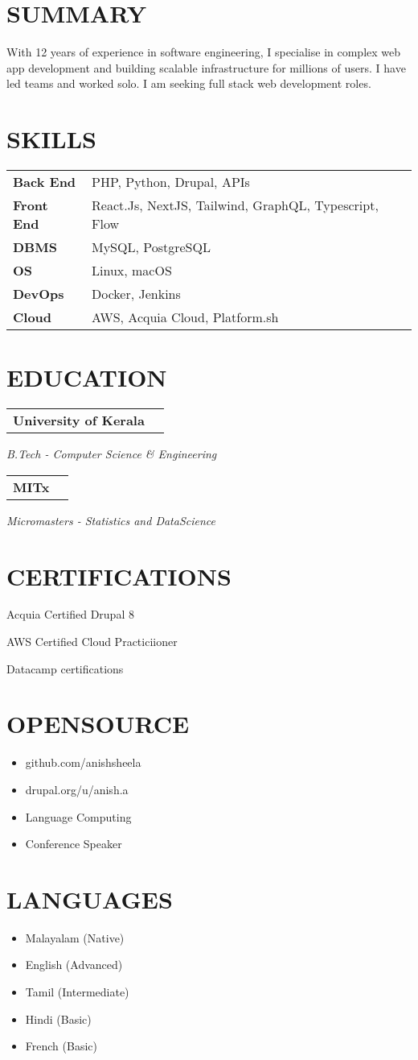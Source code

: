 \documentclass[11pt,a4paper]{moderncv}
\newcommand*{\educationentry}[4][0.5mm]{
    \begin{tabularx}{\textwidth}{LR}
        {\bfseries #3}\\
    \end{tabularx}
    {\itshape #2}
    \par\addvspace{#1}
}
\newcommand*{\scoreentry}[1][2.5mm]{
    \par\addvspace{#1}
}
\begin{document}
\begin{minipage}[t]{0.35\textwidth}
\section{SUMMARY}
With 12 years of experience in software engineering, I specialise in complex web app development and building scalable infrastructure for millions of users. I have led teams and worked solo. I am seeking full stack web development roles.

\section{SKILLS}
\begin{tabularx}{\textwidth}{>{\bfseries}l@{\hskip 3.5mm}L}
Back End & PHP, Python, Drupal, APIs \\
Front End & React.Js, NextJS, Tailwind, GraphQL, Typescript, Flow \\
DBMS & MySQL, PostgreSQL \\
OS & Linux, macOS \\
DevOps & Docker, Jenkins \\
Cloud & AWS, Acquia Cloud, Platform.sh 
\end{tabularx}

\section{EDUCATION}
\educationentry{B.Tech - Computer Science \& Engineering}{University of Kerala}{}

\vspace{2.0mm}
\educationentry{Micromasters - Statistics and DataScience}{MITx}{}

\section{CERTIFICATIONS}
\scoreentry{Acquia Certified Drupal 8}{}
\scoreentry{AWS Certified Cloud Practiciioner}{}
\scoreentry{Datacamp certifications}{}

\section{OPENSOURCE}
\begin{itemize}
    \item github.com/anishsheela
    \item drupal.org/u/anish.a
    \item Language Computing
    \item Conference Speaker
\end{itemize}

\section{LANGUAGES}
\begin{itemize}
    \item Malayalam (Native)
    \item English (Advanced)
    \item Tamil (Intermediate)
    \item Hindi (Basic)
    \item French (Basic)
\end{itemize}
\end{minipage}
\end{document}
